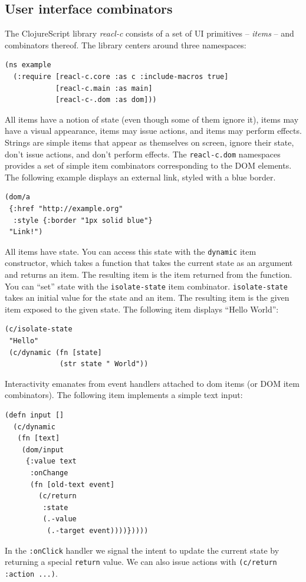 \documentclass[sigplan,screen]{acmart}
\begin{document}
\subsection{User interface combinators}

The ClojureScript library \textit{reacl-c} consists of a set of UI
primitives -- \textit{items} -- and combinators thereof. The library
centers around three namespaces:
%
\begin{verbatim}
(ns example
  (:require [reacl-c.core :as c :include-macros true]
            [reacl-c.main :as main]
            [reacl-c-.dom :as dom]))
\end{verbatim}
%
All items have a notion of state (even though some of them ignore it),
items may have a visual appearance, items may issue actions, and items
may perform effects. Strings are simple items that appear as
themselves on screen, ignore their state, don't issue actions, and
don't perform effects. The \texttt{reacl-c.dom} namespaces provides a
set of simple item combinators corresponding to the DOM elements. The
following example displays an external link, styled with a blue
border.
%
\begin{verbatim}
(dom/a
 {:href "http://example.org"
  :style {:border "1px solid blue"}
 "Link!")
\end{verbatim}
%
All items have state. You can access this state with the
\texttt{dynamic} item constructor, which takes a function that takes
the current state as an argument and returns an item. The resulting
item is the item returned from the function. You can ``set'' state
with the \texttt{isolate-state} item
combinator. \texttt{isolate-state} takes an initial value for the
state and an item. The resulting item is the given item exposed to the
given state. The following item displays ``Hello World'':
%
\begin{verbatim}
(c/isolate-state
 "Hello"
 (c/dynamic (fn [state]
             (str state " World"))
\end{verbatim}
%
Interactivity emanates from event handlers attached to dom items (or
DOM item combinators). The following item implements a simple text input:
%
\begin{verbatim}
(defn input []
  (c/dynamic
   (fn [text]
    (dom/input
     {:value text
      :onChange
      (fn [old-text event]
        (c/return
         :state
         (.-value
          (.-target event))))}))))
\end{verbatim}
%
In the \texttt{:onClick} handler we signal the intent to update the
current state by returning a special \texttt{return} value. We can
also issue actions with \texttt{(c/return :action ...)}.
\end{document}

